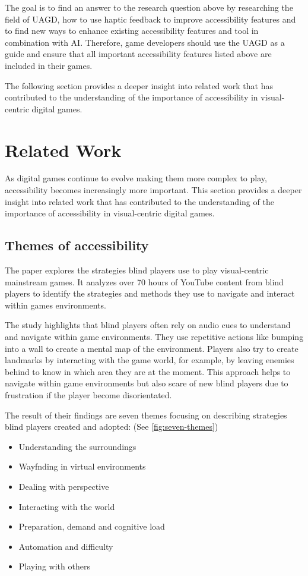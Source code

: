 \documentclass[sigconf,natbib=false,10pt]{acmart}
\begin{document}
    The goal is to find an answer to the research question above by researching the field of UAGD, how to use haptic feedback to improve accessibility features and to find new ways to enhance existing accessibility features and tool in combination with AI.
    Therefore, game developers should use the UAGD as a guide and ensure that all important accessibility features listed above are included in their games.
    
    The following section provides a deeper insight into related work that has contributed to the understanding of the importance of accessibility in visual-centric digital games.
	
	\section{Related Work} \label{sec:relatedWork}
	As digital games continue to evolve making them more complex to play, accessibility becomes increasingly more important.
	This section provides a deeper insight into related work that has contributed to the understanding of the importance of accessibility in visual-centric digital games.
	
	\subsection{Themes of accessibility}
	The paper \textcite{goncalves_my_2023} explores the strategies blind players use to play visual-centric mainstream games.
	It analyzes over 70 hours of YouTube content from blind players to identify the strategies and methods they use to navigate and interact within games environments.
	
	The study highlights that blind players often rely on audio cues to understand and navigate within game environments.
	They use repetitive actions like bumping into a wall to create a mental map of the environment.
	Players also try to create landmarks by interacting with the game world, for example, by leaving enemies behind to know in which area they are at the moment.
	This approach helps to navigate within game environments but also scare of new blind players due to frustration if the player become disorientated.
	
	The result of their findings are seven themes focusing on describing strategies blind players created and adopted: (See \autoref{fig:seven-themes})
	
	\begin{itemize}
		\setlength\itemsep{0.5em}
		\item Understanding the surroundings
		\item Wayfnding in virtual environments
		\item Dealing with perspective
		\item Interacting with the world
		\item Preparation, demand and cognitive load
		\item Automation and difficulty
		\item Playing with others
	\end{itemize}
\end{document}
